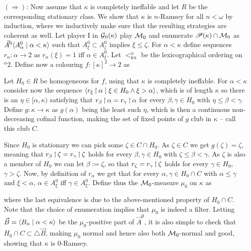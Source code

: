 \documentclass[../main]{subfiles}
\begin{document}
{	\qquad $(\Rightarrow)$: Now assume that $\kappa$ is completely ineffable and let $R$ be the corresponding stationary class. We show that $\kappa$ is $n$-Ramsey for all $n<\omega$ by induction, where we inductively make sure that the resulting strategies are coherent as well. Let player I in $\operatorname{\mathcal G}_0(\kappa)$ play $\operatorname{\mathcal M}_0$ and enumerate $\mathscr P(\kappa)\cap\operatorname{\mathcal M}_0$ as $\vec A^0\langle A^0_\alpha\mid\alpha<\kappa\rangle$ such that $A^0_\xi\subset A^0_\zeta$ implies $\xi\leq\zeta$. For $\alpha<\kappa$ define sequences $r_\alpha:\alpha\to 2$ as $r_\alpha(\xi)=1$ iff $\alpha\in A^0_\xi$. Let $<_{\text{lex}}^\alpha$ be the lexicographical ordering on $^\alpha 2$. Define now a colouring $f:[\kappa]^2\to 2$ as

	Let $H_0\in R$ be homogeneous for $f$, using that $\kappa$ is completely ineffable. For $\alpha<\kappa$ consider now the sequence $\langle r_\xi\operatorname{\upharpoonright}\alpha\mid\xi\in H_0\land\xi>\alpha\rangle$, which is of length $\kappa$ so there is an $\eta\in[\alpha,\kappa)$ satisfying that $r_\beta\operatorname{\upharpoonright}\alpha=r_\gamma\operatorname{\upharpoonright}\alpha$ for every $\beta,\gamma\in H_0$ with $\eta\leq\beta<\gamma$. Define $g:\kappa\to\kappa$ as $g(\alpha)$ being the least such $\eta$, which is then a continuous non-decreasing cofinal function, making the set of fixed points of $g$ club in $\kappa$ -- call this club $C$.

	\qquad Since $H_0$ is stationary we can pick some $\zeta\in C\cap H_0$. As $\zeta\in C$ we get $g(\zeta)=\zeta$, meaning that $r_\beta\operatorname{\upharpoonright}\zeta=r_\gamma\operatorname{\upharpoonright}\zeta$ holds for every $\beta,\gamma\in H_0$ with $\zeta\leq\beta<\gamma$. As $\zeta$ is also a member of $H_0$ we can let $\beta:=\zeta$, so that $r_\zeta=r_\gamma\operatorname{\upharpoonright}\zeta$ holds for every $\gamma\in H_0$, $\gamma>\zeta$.	Now, by definition of $r_\alpha$ we get that for every $\alpha,\gamma\in H_0\cap C$ with $\alpha\leq\gamma$ and $\xi<\alpha$, $\alpha\in A^0_\xi$ iff $\gamma\in A^0_\xi$. Define thus the $\operatorname{\mathcal M}_0$-measure $\mu_0$ on $\kappa$ as

	where the last equivalence is due to the above-mentioned property of $H_0\cap C$. Note that the choice of enumeration implies that $\mu_0$ is indeed a filter. Letting $\vec B=\langle B_\alpha\mid\alpha<\kappa\rangle$ be the $\mu_0$-positive part of $\vec A^0$, it is also simple to check that $H_0\cap C\subset\triangle\vec B$, making $\mu_0$ normal and hence also both $\operatorname{\mathcal M}_0$-normal and good, showing that $\kappa$ is $0$-Ramsey.

}
\end{document}
